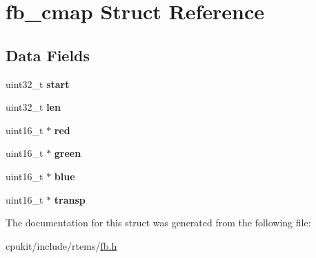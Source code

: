 \hypertarget{structfb__cmap}{}\section{fb\+\_\+cmap Struct Reference}
\label{structfb__cmap}
\subsection*{Data Fields}
\begin{DoxyCompactItemize}
\item 
\mbox{\label{structfb__cmap_a301adcddb4f58313b9e0d6fba48a49d5}} 
uint32\+\_\+t {\bfseries start}
\item 
\mbox{\label{structfb__cmap_af3d41ac4a14c9bd974a7da924d5f792a}} 
uint32\+\_\+t {\bfseries len}
\item 
\mbox{\label{structfb__cmap_abe1693c96b5dc20b55a1eac47a1c8e22}} 
uint16\+\_\+t $\ast$ {\bfseries red}
\item 
\mbox{\label{structfb__cmap_ae5319a7b50634fdc3539dd2902059cac}} 
uint16\+\_\+t $\ast$ {\bfseries green}
\item 
\mbox{\label{structfb__cmap_a80687f06d58f375e168269450305770e}} 
uint16\+\_\+t $\ast$ {\bfseries blue}
\item 
\mbox{\label{structfb__cmap_adc65afce084aa5a2cb1505870f08e6e9}} 
uint16\+\_\+t $\ast$ {\bfseries transp}
\end{DoxyCompactItemize}


The documentation for this struct was generated from the following file\+:\begin{DoxyCompactItemize}
\item 
cpukit/include/rtems/\mbox{\hyperlink{fb_8h}{fb.\+h}}\end{DoxyCompactItemize}

